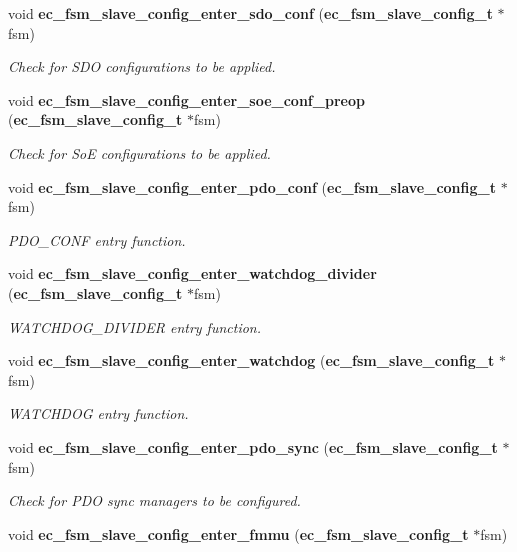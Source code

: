 \begin{DoxyCompactItemize}
void {\bf ec\-\_\-fsm\-\_\-slave\-\_\-config\-\_\-enter\-\_\-sdo\-\_\-conf} ({\bf ec\-\_\-fsm\-\_\-slave\-\_\-config\-\_\-t} $\ast$fsm)
\begin{DoxyCompactList}\small\item\em \-Check for \-S\-D\-O configurations to be applied. \end{DoxyCompactList}\item 
void {\bf ec\-\_\-fsm\-\_\-slave\-\_\-config\-\_\-enter\-\_\-soe\-\_\-conf\-\_\-preop} ({\bf ec\-\_\-fsm\-\_\-slave\-\_\-config\-\_\-t} $\ast$fsm)
\begin{DoxyCompactList}\small\item\em \-Check for \-So\-E configurations to be applied. \end{DoxyCompactList}\item 
void {\bf ec\-\_\-fsm\-\_\-slave\-\_\-config\-\_\-enter\-\_\-pdo\-\_\-conf} ({\bf ec\-\_\-fsm\-\_\-slave\-\_\-config\-\_\-t} $\ast$fsm)
\begin{DoxyCompactList}\small\item\em \-P\-D\-O\-\_\-\-C\-O\-N\-F entry function. \end{DoxyCompactList}\item 
void {\bf ec\-\_\-fsm\-\_\-slave\-\_\-config\-\_\-enter\-\_\-watchdog\-\_\-divider} ({\bf ec\-\_\-fsm\-\_\-slave\-\_\-config\-\_\-t} $\ast$fsm)
\begin{DoxyCompactList}\small\item\em \-W\-A\-T\-C\-H\-D\-O\-G\-\_\-\-D\-I\-V\-I\-D\-E\-R entry function. \end{DoxyCompactList}\item 
void {\bf ec\-\_\-fsm\-\_\-slave\-\_\-config\-\_\-enter\-\_\-watchdog} ({\bf ec\-\_\-fsm\-\_\-slave\-\_\-config\-\_\-t} $\ast$fsm)
\begin{DoxyCompactList}\small\item\em \-W\-A\-T\-C\-H\-D\-O\-G entry function. \end{DoxyCompactList}\item 
void {\bf ec\-\_\-fsm\-\_\-slave\-\_\-config\-\_\-enter\-\_\-pdo\-\_\-sync} ({\bf ec\-\_\-fsm\-\_\-slave\-\_\-config\-\_\-t} $\ast$fsm)
\begin{DoxyCompactList}\small\item\em \-Check for \-P\-D\-O sync managers to be configured. \end{DoxyCompactList}\item 
void {\bf ec\-\_\-fsm\-\_\-slave\-\_\-config\-\_\-enter\-\_\-fmmu} ({\bf ec\-\_\-fsm\-\_\-slave\-\_\-config\-\_\-t} $\ast$fsm)

\end{DoxyCompactItemize}
